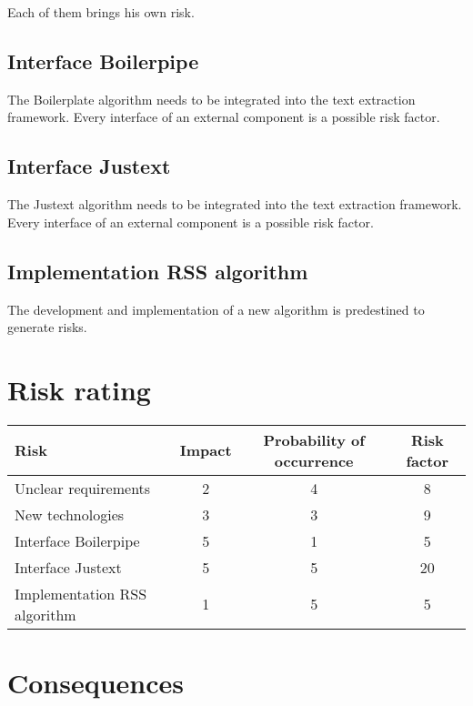 Each of them brings his own risk.

\subsection{Interface Boilerpipe}

The Boilerplate algorithm needs to be integrated into the text extraction framework. Every interface of an external component is a possible risk factor.

\subsection{Interface Justext}


The Justext algorithm needs to be integrated into the text extraction framework. Every interface of an external component is a possible risk factor.


\subsection{Implementation RSS algorithm}

The development and implementation of a new algorithm is predestined to generate risks.

\section{Risk rating}

\begin{table}[h]
\begin{tabular}{|l|c|c|c|}
\hline
\textbf{Risk} & \textbf{Impact} & \textbf{Probability of occurrence} & \textbf{Risk factor} \\ \hline
Unclear requirements & 2 & 4 & 8\\ \hline
New technologies & 3 & 3 & 9 \\ \hline
Interface Boilerpipe & 5 & 1 & 5\\ \hline
Interface Justext & 5 & 5 & 20 \\ \hline
Implementation RSS algorithm & 1 & 5 & 5\\ \hline
\end{tabular}
\end{table}

\section{Consequences}



